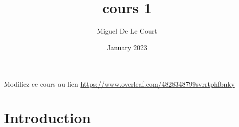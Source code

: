 \documentclass{article}
\title{cours 1}
\author{Miguel De Le Court}
\date{January 2023}
\begin{document}
\maketitle
Modifiez ce cours au lien \url{https://www.overleaf.com/4828348799svrrtphfbnky}

\section{Introduction}
\end{document}
